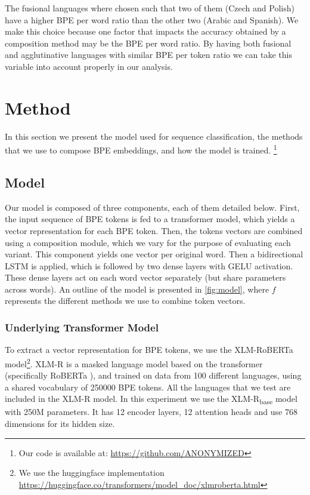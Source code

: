 \documentclass[11pt]{article}
\newcommand\citep{\cite}
\begin{document}
        The fusional languages where chosen such that two of them
        (Czech and Polish) have a higher BPE per word ratio than the
        other two (Arabic and Spanish). We make this choice because
        one factor that impacts the accuracy obtained by a composition
        method may be the BPE per word ratio.  By having both
        fusional and agglutinative languages with similar BPE per
        token ratio we can take this variable into account properly in
        our analysis.
        
	\section{Method}
	\label{method}
    	In this section we present the model used for sequence
     classification, the methods that we use to compose BPE
     embeddings, and how the model is trained. \footnote{Our code is
     available at: \url{https://github.com/ANONYMIZED}}

	\subsection{Model}

        Our model is composed of three components, each of them
        detailed below. First, the input sequence of BPE tokens is fed
        to a transformer model, which yields a vector representation for each
        BPE token. Then, the tokens vectors are combined using a
        composition module, which we vary for the purpose of
        evaluating each variant. This component yields one vector
        per original word. Then a bidirectional LSTM is applied, which
        is followed by two dense layers with GELU \citep{hendrycks2016gaussian}
        activation. These dense layers act on each word vector separately (but
        share parameters across words).  An outline of the model is
        presented in \cref{fig:model}, where $f$ represents the
        different methods we use to combine token vectors.

	\subsubsection{Underlying Transformer Model}
         To extract a vector representation for BPE tokens, we use the
     XLM-RoBERTa \cite{conneau2019unsupervised} model\footnote{We use
     the huggingface implementation
     \url{https://huggingface.co/transformers/model_doc/xlmroberta.html}}. XLM-R
     is a masked language model based on the transformer (specifically
     RoBERTa \citep{liu2019roberta}), and trained on data from 100
     different languages, using a shared vocabulary of 250000 BPE
     tokens. All the languages that we test are included in the XLM-R
     model. In this experiment we use the XLM-R\textsubscript{base} model
     with 250M parameters. It has 12 encoder layers, 12 attention
     heads and use 768 dimensions for its hidden size.
\end{document}

